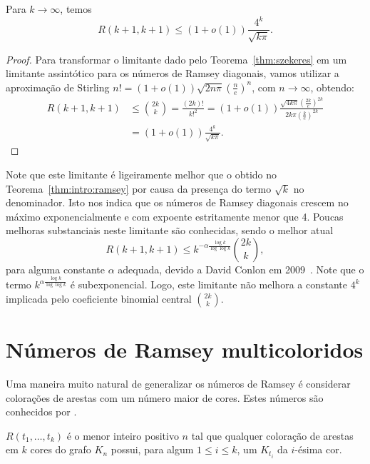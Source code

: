 \begin{corollary}
\label{col:szekeres}
Para $k \to \infty$, temos
\[ \displaystyle R(k+1,k+1) \leq (1+o(1))\frac{4^k}{\sqrt{k \pi}}.\]
\end{corollary}
\begin{proof}
Para transformar o limitante dado pelo Teorema~\ref{thm:szekeres} em um limitante assintótico para os números de Ramsey diagonais, vamos utilizar a aproximação de Stirling $n! = (1+o(1)) \sqrt{2n \pi} \left ( \frac{n}{e} \right)^n $, com $n \to \infty$, obtendo:
\begin{align*}
R(k+1,k+1) &\leq \binom{2k}{k} = \frac{(2k)!}{k!^2} = (1 +o(1)) \frac{\sqrt{4 k \pi} \left ( \frac{2k}{e} \right)^{2k} }{2k\pi \left ( \frac{k}{e} \right)^{2k} } \\
&= (1 +o(1))\frac{4^k}{\sqrt{k\pi}}.
\end{align*}
\end{proof}

Note que este limitante é ligeiramente melhor que o obtido no Teorema~\ref{thm:intro:ramsey} por causa da presença do termo $\sqrt{k}$ no denominador. Isto nos indica que os números de Ramsey diagonais crescem no máximo exponencialmente e com expoente estritamente menor que 4. Poucas melhoras substanciais neste limitante são conhecidas, sendo o melhor atual
\[R(k+1,k+1) \leq k^{-\alpha\frac{\log k}{\log \log k}} \binom{2k}{k},\]
para alguma constante $\alpha$ adequada, devido a David Conlon em 2009~\cite{conlon}. Note que o termo $k^{\alpha\frac{\log k}{\log \log k}}$ é subexponencial. Logo, este limitante não melhora a constante $4^k$ implicada pelo coeficiente binomial central $\binom{2k}{k}$.


\section{Números de Ramsey multicoloridos}

Uma maneira muito natural de generalizar os números de Ramsey é considerar colorações de arestas com um número maior de cores. Estes números são conhecidos por .

\begin{definition}
$R(t_1, \dots, t_k)$ é o menor inteiro positivo $n$ tal que qualquer coloração de arestas em $k$ cores do grafo $K_n$ possui, para algum $1 \leq i \leq k$, um $K_{t_i}$ da $i$-ésima cor.
\end{definition}

